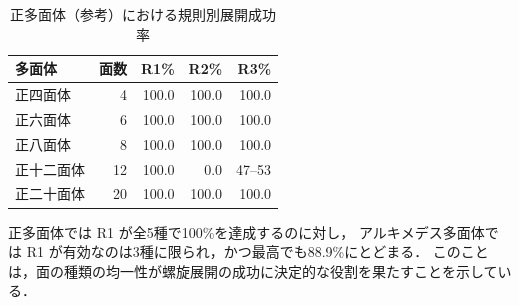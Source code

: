 \documentclass[a4paper,11pt]{article}
\begin{document}
\begin{table}[h]
\centering
\caption{正多面体（参考）における規則別展開成功率}
\label{tab:platonic}
\renewcommand{\arraystretch}{1.25}
\begin{tabular}{lrrrr}
\toprule
多面体 & 面数 & R1\% & R2\% & R3\% \\
\midrule
正四面体   &  4 & 100.0 & 100.0 & 100.0 \\
正六面体   &  6 & 100.0 & 100.0 & 100.0 \\
正八面体   &  8 & 100.0 & 100.0 & 100.0 \\
正十二面体 & 12 & 100.0 &   0.0 &  47--53 \\
正二十面体 & 20 & 100.0 & 100.0 & 100.0 \\
\bottomrule
\end{tabular}
\end{table}

正多面体では R1 が全5種で100\%を達成するのに対し，
アルキメデス多面体では R1 が有効なのは3種に限られ，かつ最高でも88.9\%にとどまる．
このことは，面の種類の均一性が螺旋展開の成功に決定的な役割を果たすことを示している．
\end{document}
